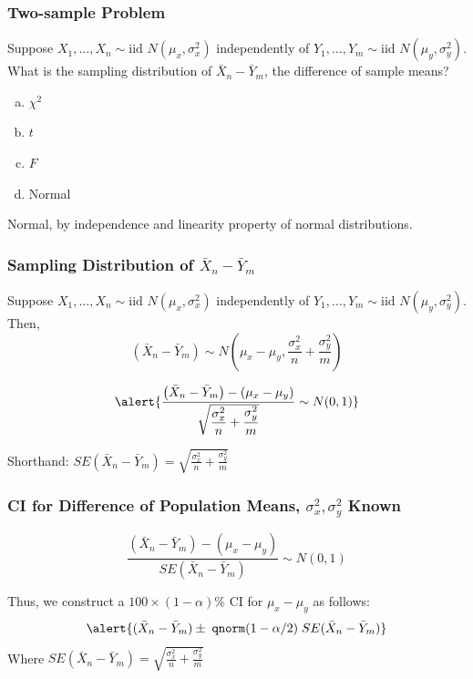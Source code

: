 \documentclass{beamer}
\begin{document}
\begin{frame}
\frametitle{Two-sample Problem }
Suppose $X_1, \hdots, X_{n} \sim \mbox{iid } N(\mu_x, \sigma^2_x)$ independently of $Y_1, \hdots, Y_{m} \sim \mbox{iid } N(\mu_y, \sigma^2_y)$. What is the \alert{sampling distribution} of $\bar{X}_n - \bar{Y}_m$, the difference of sample means?

\begin{enumerate}[(a)]
	\item $\chi^2$
	\item $t$
	\item $F$
	\item Normal
\end{enumerate}

\pause
\vspace{1em}

\alert{Normal, by independence and linearity property of normal distributions.}
\end{frame}

\begin{frame}
\frametitle{Sampling Distribution of $\bar{X}_n - \bar{Y}_m$}
Suppose $X_1, \hdots, X_{n} \sim \mbox{iid } N(\mu_x, \sigma^2_x)$ independently of $Y_1, \hdots, Y_{m} \sim \mbox{iid } N(\mu_y, \sigma^2_y)$. Then,
	$$\left(\bar{X}_n - \bar{Y}_m\right) \sim N \left( \mu_x - \mu_y, \frac{\sigma_x^2}{n} + \frac{\sigma_y^2}{m} \right) $$
	

$$\alert{\frac{\left(\bar{X}_n - \bar{Y}_m\right) - (\mu_x - \mu_y)}{\sqrt{\displaystyle\frac{\sigma_x^2}{n} + \frac{\sigma_y^2}{m} }}\sim N(0,1)}$$


Shorthand: $SE(\bar{X}_n - \bar{Y}_m) = \sqrt{\displaystyle\frac{\sigma_x^2}{n} + \frac{\sigma_y^2}{m} }$

\end{frame}

\begin{frame}
\frametitle{CI for Difference of Population Means, $\sigma_x^2, \sigma_y^2$ Known}
	$$\frac{(\bar{X}_n - \bar{Y}_m) - (\mu_x -\mu_y)}{SE(\bar{X}_n - \bar{Y}_m)} \sim N(0,1)$$
	
	\vspace{1em}

Thus, we construct a $100\times(1-\alpha)\%$ CI for $\mu_x - \mu_y$ as follows:
	$$\alert{(\bar{X}_n - \bar{Y}_m) \pm \; \texttt{qnorm}(1-\alpha/2) \; SE(\bar{X}_n - \bar{Y}_m)}$$
Where $SE(\bar{X}_n - \bar{Y}_m) = \sqrt{\displaystyle\frac{\sigma_x^2}{n} + \frac{\sigma_y^2}{m} }$
\end{frame}
\end{document}
